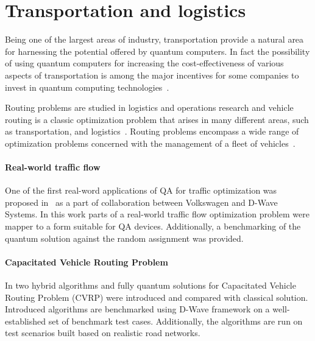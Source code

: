 \documentclass[a4paper,11pt]{article}
\begin{document}

\section{Transportation and logistics}

Being one of the largest areas of industry, transportation provide a natural area for harnessing the potential offered by quantum computers. In fact the possibility of using quantum computers for increasing the cost-effectiveness of various aspects of transportation is among the major incentives for some companies to invest in quantum computing technologies~\cite{bentley2022quantum, cooper2022exploring}.


Routing problems are studied in logistics and operations research and 
vehicle routing is a classic optimization problem that arises in many different areas, such as transportation, and logistics~\cite{dantzig1959truck,toth2002vehicle}. Routing problems encompass a wide range of optimization problems concerned with the management of a fleet of vehicles~\cite{harwood2021formulating}. 

\paragraph{Real-world traffic flow} One of the first real-word applications of QA for traffic optimization was proposed in~\cite{neukart2017traffic} as a part of collaboration between Volkswagen and D-Wave Systems. In this work parts of a real-world traffic flow optimization problem were mapper to a form suitable for QA devices. Additionally, a benchmarking of the quantum solution against the random assignment was provided.

\paragraph{Capacitated Vehicle Routing Problem} In \cite{borowski2020new} two hybrid algorithms and fully quantum solutions for Capacitated Vehicle Routing Problem (CVRP) were introduced and compared with classical solution. Introduced algorithms are benchmarked using D-Wave framework on a well-established set of benchmark test cases. Additionally, the algorithms are run on test scenarios built based on realistic road networks.
\end{document}
